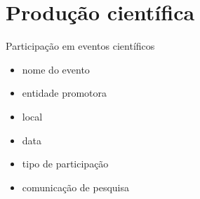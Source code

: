 \chapter{Produção científica}\label{ch:introducao}
Participação em eventos científicos 
\begin{itemize}
	\item nome do evento
	\item entidade promotora 
	\item local
	\item data
	\item tipo de participação
	\item comunicação de pesquisa
\end{itemize}
